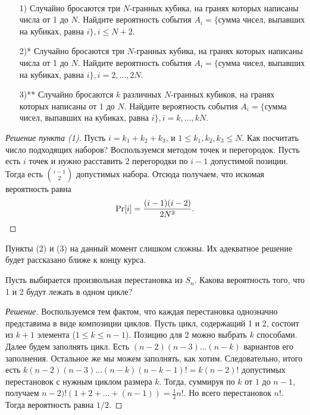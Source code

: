 \begin{problem}\ 
    \begin{enumerate}
        \item[1)] Случайно бросаются три \(N\)-гранных кубика, на гранях которых написаны числа от 1 до \(N\). Найдите вероятность события \(A_i = \{\)сумма чисел, выпавших на кубиках, равна \(i\}, i \leq N + 2\).
        \item[2)*] Случайно бросаются три \(N\)-гранных кубика, на гранях которых написаны числа от 1 до \(N\). Найдите вероятность события \(A_i = \{\)сумма чисел, выпавших на кубиках, равна \(i\}, i = 2,\ldots,2N\).
        \item[3)**] Случайно бросаются \(k\) различных \(N\)-гранных кубиков, на гранях которых написаны от 1 до \(N\). Найдите вероятность события \(A_i = \{\)сумма чисел, выпавших на кубиках, равна \(i\}, i = k,\ldots,kN\).
    \end{enumerate}
\end{problem}
\begin{proof}[Решение пункта (1)]
    Пусть \(i = k_1 + k_2 + k_3\), и \(1 \leq k_1, k_2, k_3 \leq N\). Как посчитать число подходящих наборов? Воспользуемся методом точек и перегородок. Пусть есть \(i\) точек и нужно расставить 2 перегородки по \(i - 1\) допустимой позиции. Тогда есть \(\binom{i - 1}{2}\) допустимых набора. Отсюда получаем, что искомая вероятность равна \[\Pr[i] = \frac{(i - 1)(i - 2)}{2N^3}.\qedhere\]
\end{proof}
\begin{remark}
    Пункты (2) и (3) на данный момент слишком сложны. Их адекватное решение будет рассказано ближе к концу курса.
\end{remark}

\begin{problem}
    Пусть выбирается произвольная перестановка из \(S_n\). Какова вероятность того, что 1 и 2 будут лежать в одном цикле?
\end{problem}
\begin{proof}[Решение]
    Воспользуемся тем фактом, что каждая перестановка однозначно представима в виде композиции циклов. Пусть цикл, содержащий 1 и 2, состоит из \(k + 1\) элемента (\(1 \leq k \leq n - 1\)). Позицию для 2 можно выбрать \(k\) способами. Далее будем заполнять цикл. Есть \((n - 2)(n - 3)\ldots(n - k)\) вариантов его заполнения. Остальное же мы можем заполнять, как хотим. Следовательно, итого есть \(k(n - 2)(n - 3)\ldots(n - k)(n - k - 1)! = k(n - 2)!\) допустимых перестановок с нужным циклом размера \(k\). Тогда, суммируя по \(k\) от \(1\) до \(n - 1\), получаем \(n - 2)!(1 + 2 + \ldots + (n - 1)) = \frac{1}{2}n!\). Но всего перестановок \(n!\). Тогда вероятность равна \(1/2\). 
\end{proof}

